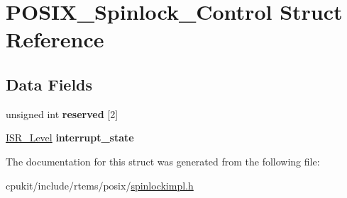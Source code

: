 \hypertarget{structPOSIX__Spinlock__Control}{}\section{P\+O\+S\+I\+X\+\_\+\+Spinlock\+\_\+\+Control Struct Reference}
\label{structPOSIX__Spinlock__Control}
\subsection*{Data Fields}
\begin{DoxyCompactItemize}
\item 
\mbox{\label{structPOSIX__Spinlock__Control_a672d191b3941e2fb4f3b1a8534e9918d}} 
unsigned int {\bfseries reserved} \mbox{[}2\mbox{]}
\item 
\mbox{\label{structPOSIX__Spinlock__Control_a14f12dd8059a60eb832ac00a0d8b0af8}} 
\mbox{\hyperlink{group__RTEMSScoreISR_gad1af728587ebcefec5b5cf94fc7909b9}{I\+S\+R\+\_\+\+Level}} {\bfseries interrupt\+\_\+state}
\end{DoxyCompactItemize}


The documentation for this struct was generated from the following file\+:\begin{DoxyCompactItemize}
\item 
cpukit/include/rtems/posix/\mbox{\hyperlink{spinlockimpl_8h}{spinlockimpl.\+h}}\end{DoxyCompactItemize}
